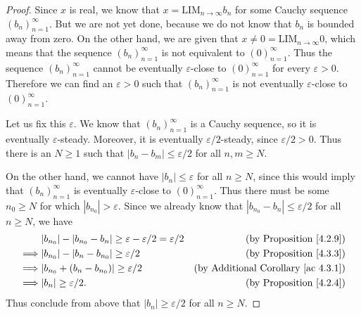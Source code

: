 \begin{proof}
Since \(x\) is real, we know that \(x = \text{LIM}_{n \to \infty} b_n\) for some Cauchy sequence \((b_n)_{n = 1}^{\infty}\).
But we are not yet done, because we do not know that \(b_n\) is bounded away from zero.
On the other hand, we are given that \(x \neq 0 = \text{LIM}_{n \to \infty} 0\), which means that the sequence \((b_n)_{n = 1}^{\infty}\) is not equivalent to \((0)_{n = 1}^{\infty}\).
Thus the sequence \((b_n)_{n = 1}^{\infty}\) cannot be eventually \(\varepsilon\)-close to \((0)_{n = 1}^{\infty}\) for every \(\varepsilon > 0\).
Therefore we can find an \(\varepsilon > 0\) such that \((b_n)_{n = 1}^{\infty}\) is not eventually \(\varepsilon\)-close to \((0)_{n = 1}^{\infty}\).

Let us fix this \(\varepsilon\).
We know that \((b_n)_{n = 1}^{\infty}\) is a Cauchy sequence, so it is eventually \(\varepsilon\)-steady.
Moreover, it is eventually \(\varepsilon / 2\)-steady, since \(\varepsilon / 2 > 0\).
Thus there is an \(N \geq 1\) such that \(|b_n - b_m| \leq \varepsilon / 2\) for all \(n, m \geq N\).

On the other hand, we cannot have \(|b_n| \leq \varepsilon\) for all \(n \geq N\), since this would imply that \((b_n)_{n = 1}^{\infty}\) is eventually \(\varepsilon\)-close to \((0)_{n = 1}^{\infty}\).
Thus there must be some \(n_0 \geq N\) for which \(|b_{n_0}| > \varepsilon\).
Since we already know that \(|b_{n_0} - b_n| \leq \varepsilon / 2\) for all \(n \geq N\), we have
\begin{align*}
& |b_{n_0}| - |b_{n_0} - b_n| \geq \varepsilon - \varepsilon / 2 = \varepsilon / 2 & \text{(by Proposition \ref{4.2.9})} \\
\implies & |b_{n_0}| - |b_n - b_{n_0}| \geq \varepsilon / 2 & \text{(by Proposition \ref{4.3.3})} \\
\implies & |b_{n_0} + (b_n - b_{n_0})| \geq \varepsilon / 2 & \text{(by Additional Corollary \ref{ac 4.3.1})} \\
\implies & |b_n| \geq \varepsilon / 2. & \text{(by Proposition \ref{4.2.4})} \\
\end{align*}
Thus conclude from above that \(|b_n| \geq \varepsilon / 2\) for all \(n \geq N\).


\end{proof}

